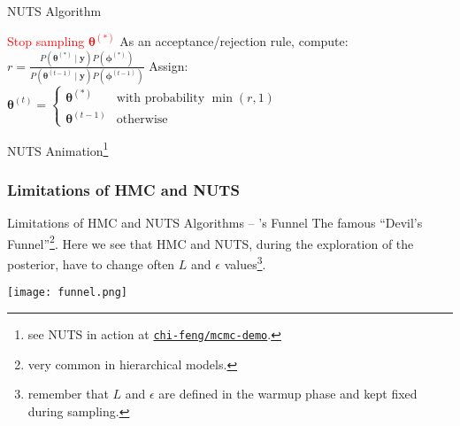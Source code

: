 \begin{frame}{NUTS Algorithm}
\begin{algorithm}[H]
{{{				}{
					\textcolor{red}{Stop sampling $\boldsymbol{\theta}^{(*)}$\;
					}
				}
			}
		}
		As an acceptance/rejection rule, compute:
		$r = \frac{P \left(\boldsymbol{\theta}^{(*)} \mid \mathbf{y} \right) P \left(\boldsymbol{\phi}^{(*)} \right)}{P \left(\boldsymbol{\theta}^{(t-1)} \mid \mathbf{y} \right) P \left(\boldsymbol{\phi}^{(t-1)} \right)}$\;
		Assign:
		$
			\boldsymbol{\theta}^{(t)} =
			\begin{cases}
				\boldsymbol{\theta}^{(*)}   & \text{with probability $\min(r,1)$} \\
				\boldsymbol{\theta}^{(t-1)} & \text{otherwise}
			\end{cases}
		$\;
		\caption{No-U-Turn-Sampler (NUTS)}
	\end{algorithm}
\end{frame}

\begin{frame}{NUTS Animation\footnote{see NUTS in action at \href{https://chi-feng.github.io/mcmc-demo/app.html?algorithm=EfficientNUTS&target=banana}{\texttt{chi-feng/mcmc-demo}}.}}
	\centering
\end{frame}

\subsubsection{Limitations of HMC and NUTS}
\begin{frame}{Limitations of HMC and NUTS Algorithms -- \textcite{nealSliceSampling2003}'s Funnel}
	The famous ``Devil's Funnel''\footnote{very common in hierarchical models.}.
	Here we see that HMC and NUTS, during the exploration of the posterior,
	have to change often $L$ and $\epsilon$ values\footnote{
		remember that $L$ and $\epsilon$ are defined in the warmup phase and kept fixed during sampling.}.




	\centering
	\texttt{[image: funnel.png]}
\end{frame}

